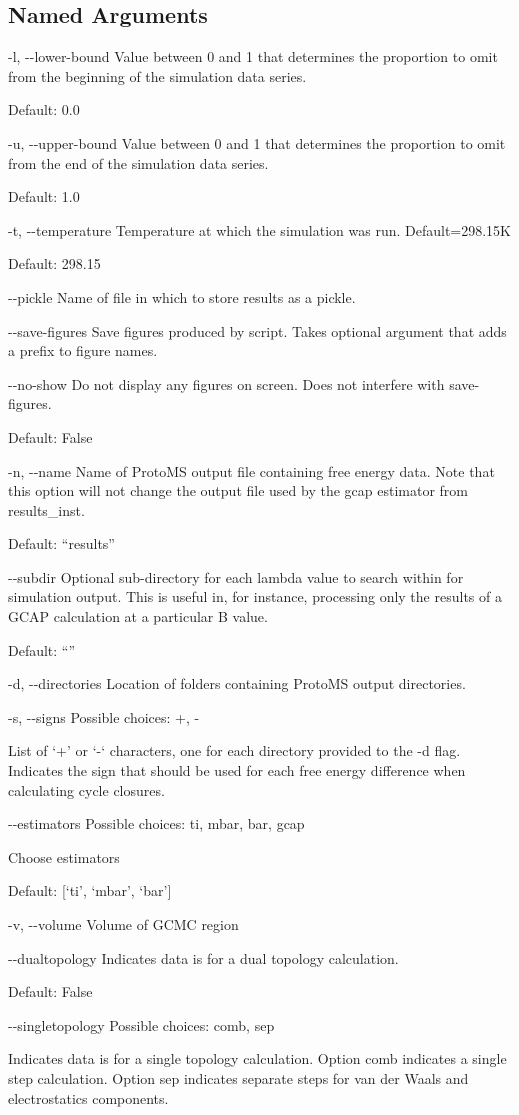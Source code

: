 \documentclass[letterpaper,10pt,english]{sphinxmanual}
\begin{document}
\subsection{Named Arguments}
\label{\detokenize{tools:Named Arguments}}\begin{optionlist}{3cm}
\item [-l, -{-}lower-bound]  
Value between 0 and 1 that determines the proportion to omit from the beginning of the simulation data series.

Default: 0.0
\item [-u, -{-}upper-bound]  
Value between 0 and 1 that determines the proportion to omit from the end of the simulation data series.

Default: 1.0
\item [-t, -{-}temperature]  
Temperature at which the simulation was run. Default=298.15K

Default: 298.15
\item [-{-}pickle]  
Name of file in which to store results as a pickle.
\item [-{-}save-figures]  
Save figures produced by script. Takes optional argument that adds a prefix to figure names.
\item [-{-}no-show]  
Do not display any figures on screen. Does not interfere with \textendash{}save-figures.

Default: False
\item [-n, -{-}name]  
Name of ProtoMS output file containing free energy data. Note that this option will not change the output file used by the gcap estimator from results\_inst.

Default: “results”
\item [-{-}subdir]  
Optional sub-directory for each lambda value to search within for simulation output. This is useful in, for instance, processing only the results of a GCAP calculation at a particular B value.

Default: “”
\item [-d, -{-}directories]  
Location of folders containing ProtoMS output directories.
\item [-s, -{-}signs]  
Possible choices: +, -

List of ‘+’ or ‘-‘ characters, one for each directory provided to the -d flag. Indicates the sign that should be used for each free energy difference when calculating cycle closures.
\item [-{-}estimators]  
Possible choices: ti, mbar, bar, gcap

Choose estimators

Default: {[}‘ti’, ‘mbar’, ‘bar’{]}
\item [-v, -{-}volume]  
Volume of GCMC region
\item [-{-}dualtopology]  
Indicates data is for a dual topology calculation.

Default: False
\item [-{-}singletopology]  
Possible choices: comb, sep

Indicates data is for a single topology calculation. Option comb indicates a single step calculation. Option sep indicates separate steps for van der Waals  and electrostatics components.
\end{optionlist}
\end{document}
